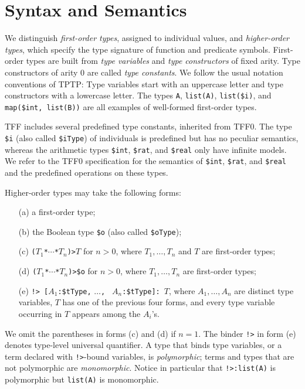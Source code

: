 \section{Syntax and Semantics} \label{sec_logic}

We distinguish {\em first-order types}, assigned
to individual values, and {\em higher-order types\/},
which specify the type signature of function and predicate symbols.
%
First-order types are built from {\em type variables\/}
and {\em type constructors\/} of fixed arity. Type constructors
of arity 0 are called {\em type constants}. We follow the usual
notation conventions of TPTP: Type variables start with an
uppercase letter and type constructors with a lowercase letter.
The types \verb+A+, \verb+list(A)+, \verb+list($i)+, and
\verb+map($int,+~\verb+list(B))+ are all examples of well-formed first-order
types.

TFF includes several predefined type constants, inherited from TFF0.
The type \verb+$i+ (also called \verb+$iType+) of individuals is predefined
but has no peculiar semantics, whereas the arithmetic types
\verb+$int+, \verb+$rat+, and \verb+$real+ only have infinite models. We refer
to the TFF0 specification \cite{TFF0} for the semantics of
\verb+$int+, \verb+$rat+, and \verb+$real+ and the predefined operations on
these types. %

Higher-order types may take the following forms:
%
\begin{enumerate}
\item[(a)] a first-order type;
\item[(b)] the Boolean type \verb+$o+ (also called \verb+$oType+);
\item[(c)] {\tt ($T_1$\;*\;${\cdots}$\;*\;$T_n$)\;>\;$T$} for $n > 0$,
where $T_1,\dots,T_n$ and $T$ are first-order types;
\item[(d)] {\tt ($T_1$\;*\;${\cdots}$\;*\;$T_n$)\;>\;\$o} for $n > 0$,
where $T_1,\dots,T_n$ are first-order types;
\item[(e)] {\tt !>\ [$A_1$\;:\;\$tType,} {\tt ${\dots}$,} {\tt
$A_n$\;:\;\$tType]:\ $T$}, where $A_1,\dots,A_n$ are distinct type variables, $T$
has one of the previous four forms, and every type variable occurring in $T$
appears among the $A_i$'s.
\end{enumerate}
%
We omit the parentheses in forms (c) and (d) if $n = 1$. The binder {\tt !>} in
form (e) denotes type-level universal quantifier. A type that binds type
variables, or a term declared with {\tt !>}-bound variables, is {\em
polymorphic}; terms and types that are not polymorphic are {\em monomorphic}.
Notice in particular that {\tt !>\;[$A$\;:\;\$tType]:\;list(A)} is polymorphic
but {\tt list(A)} is monomorphic.

